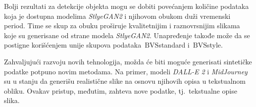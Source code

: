 \documentclass[12pt,oneside]{memoir}
\newcommand{\bvs}{\ensuremath{\,\textrm{BVS}}}
\begin{document}
Bolji rezultati za detekcije objekta mogu se dobiti povećanjem količine podataka koja je dostupna modelima \textit{StlyeGAN2} i njihovom obukom duži vremenski period. Time se skup za obuku proširuje kvalitetnijim i raznovrsnijim slikama koje su generisane od strane modela \textit{StlyeGAN2}.
Unapređenje takođe može da se postigne korišćenjem unije skupova podataka \bvs{standard} i \bvs{style}.

Zahvaljujući razvoju novih tehnologija, možda će biti moguće generisati sintetičke podatke potpuno novim metodama. Na primer, modeli \textit{DALL-E 2} \cite{reddy2021dall} i \textit{MidJourney} \cite{midjourney2022} su u stanju da generišu realistične slike na osnovu njihovih opisa u tekstualnom obliku. Ovakav pristup, međutim, zahteva nove podatke, tj.~tekstualne opise slika.



\literatura


\backmatter
\end{document}
